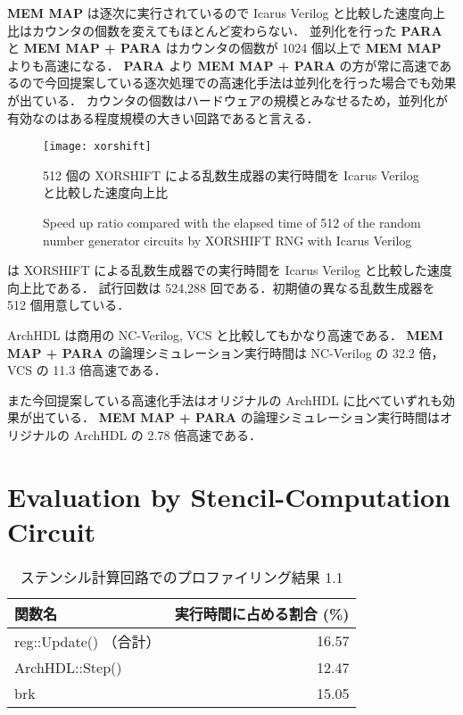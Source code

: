 \textbf{MEM MAP} は逐次に実行されているので Icarus Verilog と比較した速度向上比はカウンタの個数を変えてもほとんど変わらない．
並列化を行った \textbf{PARA} と \textbf{MEM MAP + PARA} はカウンタの個数が 1024 個以上で \textbf{MEM MAP} よりも高速になる．
\textbf{PARA} より \textbf{MEM MAP + PARA} の方が常に高速であるので今回提案している逐次処理での高速化手法は並列化を行った場合でも効果が出ている．
カウンタの個数はハードウェアの規模とみなせるため，並列化が有効なのはある程度規模の大きい回路であると言える．


\begin{figure}[tb]
 \centering
 \texttt{[image: xorshift]}
 \caption{512 個の XORSHIFT による乱数生成器の実行時間を Icarus Verilog と比較した速度向上比}
\fi
 \caption{Speed up ratio compared with the elapsed time of 512 of the random number generator circuits by XORSHIFT RNG with Icarus Verilog}
 \label{fig:xorshift}
\end{figure}

 は XORSHIFT による乱数生成器での実行時間を Icarus Verilog と比較した速度向上比である．
試行回数は 524,288 回である．初期値の異なる乱数生成器を 512 個用意している．

ArchHDL は商用の NC-Verilog, VCS と比較してもかなり高速である．
\textbf{MEM MAP + PARA} の論理シミュレーション実行時間は NC-Verilog の 32.2 倍，VCS の 11.3 倍高速である．

また今回提案している高速化手法はオリジナルの ArchHDL に比べていずれも効果が出ている．
\textbf{MEM MAP + PARA} の論理シミュレーション実行時間はオリジナルの ArchHDL の 2.78 倍高速である．


\section{Evaluation by Stencil-Computation Circuit}


\begin{table}[tb]
 \caption{ステンシル計算回路でのプロファイリング結果 1.1}
 \label{table:stencil_prof1.1}
 \begin{center}
  \begin{tabular}{lr} \toprule
  関数名 & 実行時間に占める割合 (\%) \\ \midrule
  reg::Update() （合計） & 16.57 \\
  ArchHDL::Step() & 12.47 \\
  brk & 15.05 \\ \bottomrule
  \end{tabular}
 \end{center}
\end{table}

